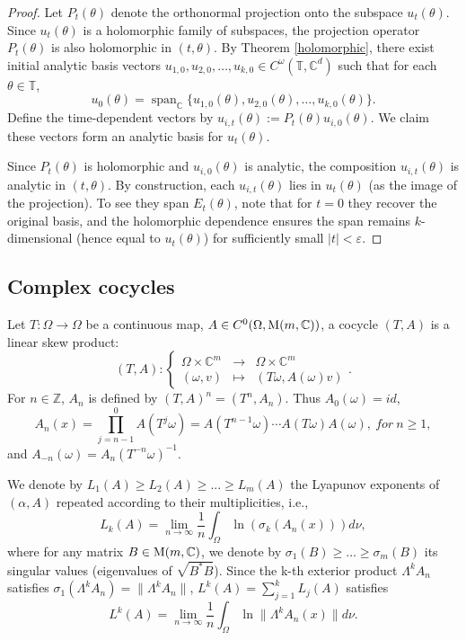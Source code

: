 \documentclass[11pt]{amsart}
\theoremstyle{remark}
\theoremstyle{definition}
\newcommand{\C}{{\mathbf C}}
\newcommand{\CC}{{\mathbb C}}
\def \C{{\mathcal{C}}}
\def\C{{\mathbb C}}
\begin{document}
\begin{proof}
    Let \( P_t(\theta) \) denote the orthonormal projection onto the subspace \( u_t(\theta) \). Since \( u_t(\theta) \) is a holomorphic family of subspaces, the projection operator \( P_t(\theta) \) is also holomorphic in \( (t,\theta) \). By Theorem \ref{holomorphic}, there exist initial analytic basis vectors \( u_{1,0}, u_{2,0}, \dots, u_{k,0} \in C^\omega(\mathbb{T}, \mathbb{C}^d) \) such that for each \( \theta \in \mathbb{T} \),
    \[
    u_0(\theta) = \operatorname{span}_\mathbb{C}\{u_{1,0}(\theta), u_{2,0}(\theta), \dots, u_{k,0}(\theta)\}.
    \]
    Define the time-dependent vectors by \( u_{i,t}(\theta) := P_t(\theta)u_{i,0}(\theta) \). We claim these vectors form an analytic basis for \( u_t(\theta) \).

    Since \( P_t(\theta) \) is holomorphic and \( u_{i,0}(\theta) \) is analytic, the composition \( u_{i,t}(\theta) \) is analytic in \( (t,\theta) \). By construction, each \( u_{i,t}(\theta) \) lies in \( u_t(\theta) \) (as the image of the projection). To see they span \( E_t(\theta) \), note that for \( t=0 \) they recover the original basis, and the holomorphic dependence ensures the span remains \( k \)-dimensional (hence equal to \( u_t(\theta) \)) for sufficiently small \( |t| < \varepsilon \).
\end{proof}




\subsection{Complex  cocycles}\label{com}
Let $T:\Omega\to \Omega$ be a continuous map,  $A\in C^0(\Omega,{\rm M}(m,\C))$, a cocycle $(T, A)$ is a linear skew product:
$$
(T,A)\colon \left\{
\begin{array}{rcl}
	\Omega \times \CC^{m} &\to& \Omega \times \CC^{m}\\[1mm]
	(\omega,v) &\mapsto& (T\omega,A(\omega)v)
\end{array}
\right.  .
$$
For $n\in\mathbb{Z}$, $A_n$ is defined by $(T,A)^n=(T^n,A_n).$ Thus $A_{0}(\omega)=id$,
\begin{equation*}
	A_{n}(x)=\prod_{j=n-1}^{0}A(T^{j}\omega)=A(T^{n-1}\omega)\cdots A(T\omega)A(\omega),\ for\ n\ge1,
\end{equation*}
and $A_{-n}(\omega)=A_{n}(T^{-n}\omega)^{-1}$.



We denote by $L_1(A)\geq L_2(A)\geq...\geq L_m(A)$ the Lyapunov exponents of $(\alpha,A)$ repeated according to their multiplicities, i.e.,
$$
L_k(A)=\lim\limits_{n\rightarrow\infty}\frac{1}{n}\int_{\Omega}\ln(\sigma_k(A_n(x)))d\nu,
$$
where for any matrix $B\in {\rm M}(m,\C)$, we denote by
$\sigma_1(B)\geq...\geq \sigma_m(B)$ its singular values (eigenvalues
of $\sqrt{B^*B}$).  Since the k-th exterior product $\Lambda^k A_n$ satisfies $\sigma_1(\Lambda^k A_n)=\|\Lambda^k A_n\|$, $L^k(A)=\sum_{j=1}^kL_j(A)$ satisfies
$$
L^k(A)=\lim\limits_{n\rightarrow \infty}\frac{1}{n}\int_{\Omega}\ln\|\Lambda^kA_n(x)\|d\nu.
$$
\end{document}
